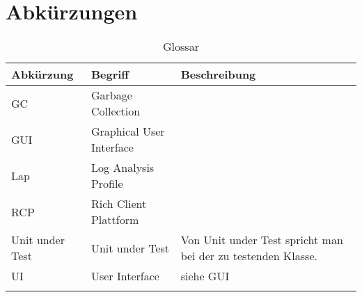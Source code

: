 \chapter*{Abkürzungen}\label{abkuerzungen}
  \begin{longtable}{|p{3cm}|p{5cm}|p{6cm}|}
\hline
  \textbf{Abkürzung} &\textbf{Begriff} &  \textbf{Beschreibung} \\\hline
  GC & Garbage Collection & \\\hline
GUI & Graphical User Interface & \\\hline
Lap & Log Analysis Profile & \\\hline
RCP & Rich Client Plattform &\\\hline
Unit under Test & Unit under Test & Von Unit under Test spricht man bei der zu testenden Klasse.\\\hline
UI & User Interface & siehe GUI \\\hline
      \caption{Glossar}\\
  \end{longtable}



